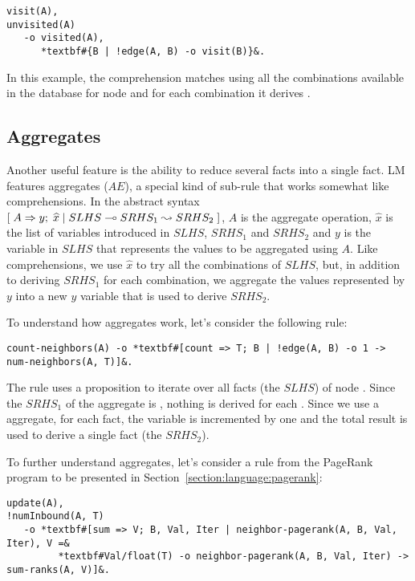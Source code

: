 \begin{Verbatim}[fontsize=\codesize,commandchars=\*\#\&]
visit(A),
unvisited(A)
   -o visited(A),
      *textbf#{B | !edge(A, B) -o visit(B)}&.
\end{Verbatim}

In this example, the comprehension matches  using all the
combinations available in the database for node  and for each
combination it derives .

\subsection{Aggregates}

Another useful feature is the ability to reduce several facts
into a single fact. LM features aggregates ($AE$), a special kind of sub-rule
that works somewhat like comprehensions. In the abstract syntax
$[\; A \Rightarrow y; \; \widehat{x} \; | \; SLHS \multimap SRHS_1 \leadsto SRHS_2 \;]$, $A$ is the aggregate
operation, $\widehat{x}$ is the list of variables introduced in $SLHS$, $SRHS_1$
and $SRHS_2$ and $y$ is the variable in $SLHS$ that represents the values to be
aggregated using $A$. Like comprehensions, we use $\widehat{x}$ to try all the
combinations of $SLHS$, but, in addition to deriving $SRHS_1$ for each
combination, we aggregate the values represented by $y$ into a new $y$ variable
that is used to derive $SRHS_2$.

To understand how aggregates work, let's consider the following rule:

\begin{Verbatim}[fontsize=\codesize,commandchars=\*\#\&]
count-neighbors(A) -o *textbf#[count => T; B | !edge(A, B) -o 1 -> num-neighbors(A, T)]&.
\end{Verbatim}

The rule uses a  proposition to iterate over all
 facts (the $SLHS$) of node . Since the $SRHS_1$ of the
aggregate is , nothing is derived for each . Since we use a
 aggregate, for each  fact, the variable  is
incremented by one and the total result is used to derive a single
 fact (the $SRHS_2$).

To further understand aggregates, let's consider a rule from the PageRank
program to be presented in Section~\ref{section:language:pagerank}:

\begin{Verbatim}[fontsize=\codesize,commandchars=\*\#\&]
update(A),
!numInbound(A, T)
   -o *textbf#[sum => V; B, Val, Iter | neighbor-pagerank(A, B, Val, Iter), V =&
         *textbf#Val/float(T) -o neighbor-pagerank(A, B, Val, Iter) -> sum-ranks(A, V)]&.
\end{Verbatim}

